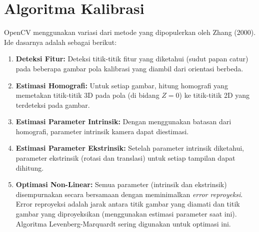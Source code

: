 \documentclass[12pt,a4paper]{article}
\begin{document}
\section{Algoritma Kalibrasi}
OpenCV menggunakan variasi dari metode yang dipopulerkan oleh Zhang (2000). Ide
dasarnya adalah sebagai berikut:
\begin{enumerate}[label=\alph*.]
    \item \textbf{Deteksi Fitur:} Deteksi titik-titik fitur yang diketahui (sudut papan catur) pada beberapa gambar pola kalibrasi yang diambil dari orientasi berbeda.
    \item \textbf{Estimasi Homografi:} Untuk setiap gambar, hitung homografi yang memetakan titik-titik 3D pada pola (di bidang $Z=0$) ke titik-titik 2D yang terdeteksi pada gambar.
    \item \textbf{Estimasi Parameter Intrinsik:} Dengan menggunakan batasan dari homografi, parameter intrinsik kamera dapat diestimasi.
    \item \textbf{Estimasi Parameter Ekstrinsik:} Setelah parameter intrinsik diketahui, parameter ekstrinsik (rotasi dan translasi) untuk setiap tampilan dapat dihitung.
    \item \textbf{Optimasi Non-Linear:} Semua parameter (intrinsik dan ekstrinsik) disempurnakan secara bersamaan dengan meminimalkan \textit{error reproyeksi}. Error reproyeksi adalah jarak antara titik gambar yang diamati dan titik gambar yang diproyeksikan (menggunakan estimasi parameter saat ini). Algoritma Levenberg-Marquardt sering digunakan untuk optimasi ini.
\end{enumerate}
\end{document}
